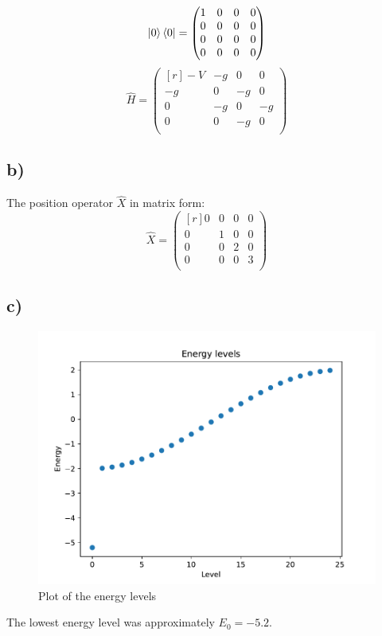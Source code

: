 \documentclass{article}
\begin{document}
\[
\ket{0}\bra{0} = 
\begin{pmatrix*}[r]
 1 & 0 & 0 & 0 \\
 0 & 0 & 0 & 0 \\
 0 & 0 & 0 & 0 \\
 0 & 0 & 0 & 0 \\
\end{pmatrix*}
\]
\[
\hat{H} =
\begin{pmatrix*}[r]
 -V & -g & 0 & 0 \\
 -g & 0 & -g & 0 \\
 0 & -g & 0 & -g \\
 0 & 0 & -g & 0 \\
\end{pmatrix*}
\]

\subsection*{b)}
The position operator $\hat{X}$ in matrix form:
\[
\hat{X} = 
\begin{pmatrix*}[r]
 0 & 0 & 0 & 0 \\
 0 & 1 & 0 & 0 \\
 0 & 0 & 2 & 0 \\
 0 & 0 & 0 & 3 \\
\end{pmatrix*}
\]

\subsection*{c)}

\begin{figure}[h!]
\centering
\includegraphics[width = .75\textwidth]{energy_levels.pdf}
\caption{Plot of the energy levels}
\label{fig: energy_levels}
\end{figure}
The lowest energy level was approximately $E_0 = -5.2$. 
\end{document}
